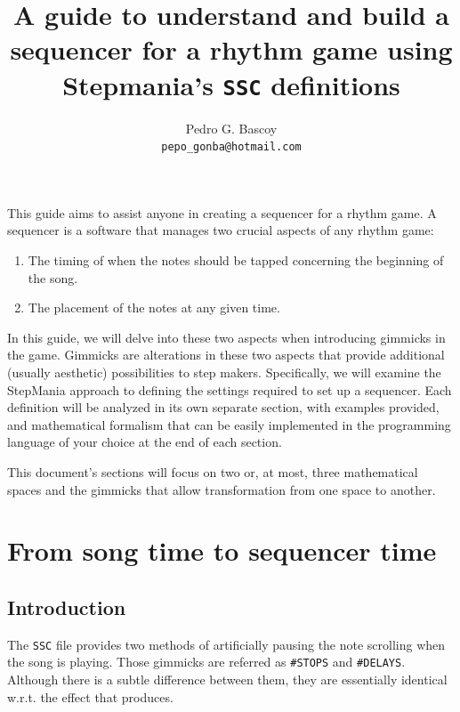\documentclass[a4paper,9pt]{article}
\begin{document}
    
\title{A guide to understand and build a sequencer for a rhythm game using Stepmania's \texttt{SSC} definitions}
    \author{
        Pedro G. Bascoy\\
        \texttt{pepo\_gonba@hotmail.com}\\
    }
    \maketitle

This guide aims to assist anyone in creating a sequencer for a rhythm game. A sequencer is a software that manages two crucial aspects of any rhythm game:
    \begin{enumerate}
	    \item The timing of when the notes should be tapped concerning the beginning of the song.
	    \item The placement of the notes at any given time.
    \end{enumerate}

In this guide, we will delve into these two aspects when introducing gimmicks in the game. Gimmicks are alterations in these two aspects that provide additional (usually aesthetic) possibilities to step makers. Specifically, we will examine the StepMania approach to defining the settings required to set up a sequencer. Each definition will be analyzed in its own separate section, with examples provided, and mathematical formalism that can be easily implemented in the programming language of your choice at the end of each section.

This document's sections will focus on two or, at most, three mathematical spaces and the gimmicks that allow transformation from one space to another.
   
    \section{From song time to sequencer time}\label{sec:songtime2seqtime}
    \subsection{Introduction}

    The \texttt{SSC} file provides two methods of artificially pausing the note scrolling when the song is playing. Those gimmicks are referred as \texttt{\#STOPS} and \texttt{\#DELAYS}. Although there is a subtle difference between them, they are essentially identical w.r.t. the effect that produces.
\end{document}
